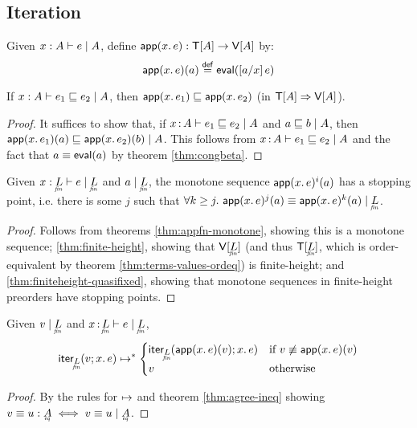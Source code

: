 \documentclass{article}
\newcommand{\expope}[2]{#1 \Rightarrow #2}
\newcommand{\lrof}[1]{\ms{T}[#1]}
\newcommand{\Val}[1]{\ms{V}[#1]}
\begin{document}

\subsection{Iteration}

\newcommand{\appfn}[2]{\ms{app}(\bind{#1}{#2})}
\newcommand{\nthapp}[4]{\appfn{#1}{#2}^{#3}(#4)}

\begin{definition}
  Given $\lrcx{x:A}{A}{e}$, define $\appfn{x}{e} : \lrof{A} \to \Val{A}$
  by: \[\appfn{x}{e}(a) \defeq \evalfn(\sub{a/x} e)\]
\end{definition}

\begin{theorem}\label{thm:appfn-monotone}
  If $\lrcx{x:A}{A}{e_1 \ale e_2}$, then $\appfn{x}{e_1} \ale \appfn{x}{e_2}$
  (in $\expope{\lrof{A}}{\Val{A}}$).
\end{theorem}

\begin{proof}

  It suffices to show that, if $\lrcx{x\of A}{A}{e_1 \ale e_2}$ and $\lr{A}{a
    \ale b}$, then $\lr{A}{\appfn{x}{e_1}(a) \ale \appfn{x}{e_2}(b)}$. This
  follows from $\lrcx{x\of A}{A}{e_1 \ale e_2}$ and the fact that $a \equiv
  \evalfn(a)$ by theorem \ref{thm:congbeta}.
\end{proof}

\begin{corollary}\label{cor:fineq-stops}
  Given $\lrcx{x:\fineq{L}}{\fineq{L}}{e}$ and $\lr{\fineq{L}}{a}$, the monotone
  sequence $\nthapp{x}{e}{i}{a}$ has a stopping point, i.e. there is some $j$
  such that $\forall k \ge j.\ \lr{\fineq{L}}{\nthapp{x}{e}{j}{a} \equiv
    \nthapp{x}{e}{k}{a}}$.
\end{corollary}
\begin{proof}
  Follows from theorems \ref{thm:appfn-monotone}, showing this is a monotone
  sequence; \ref{thm:finite-height}, showing that $\Val{\fineq{L}}$ (and thus
  $\lrof{\fineq{L}}$, which is order-equivalent by theorem
  \ref{thm:terms-values-ordeq}) is finite-height; and
  \ref{thm:finiteheight-quasifixed}, showing that monotone sequences in
  finite-height preorders have stopping points.
\end{proof}

\begin{lemma}\label{lem:iter-onestep}
  Given $\lr{\fineq{L}}{v}$ and $\lrcx{x\of\fineq{L}}{\fineq{L}}{e}$,
  \[
  \iter{\fineq{L}}{v}{x}{e} \steps
  \begin{cases}
    \iter{\fineq{L}}{\appfn{x}{e}(v)}{x}{e}
    & \text{if}~v \not\equiv \appfn{x}{e}(v)\\
    v & \text{otherwise}
  \end{cases}
  \]
\end{lemma}
\begin{proof}
  By the rules for $\step$ and theorem \ref{thm:agree-ineq} showing $v \equiv u
  : \eq{A} \iff \lr{\eq{A}}{v \equiv u}$.
\end{proof}
\end{document}
